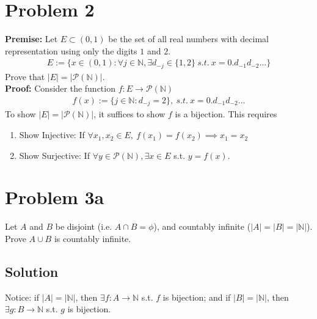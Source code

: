\documentclass[12pt,fleqn]{article}
\numberwithin{equation}{section} %
\begin{document}
\section*{Problem 2}
\textbf{Premise:} Let $E \subset (0,1)$ be the set of all real numbers with decimal representation using only the digits $1$ and $2$.
\begin{align}
	E:= \{x \in (0,1) : \forall j \in \mathbb N, \exists d_{-j} \in \{1,2\} ~ s.t. ~ x = 0.d_{-1}d_{-2}...\}
\end{align}
Prove that $|E| = |\mathcal P(\mathbb N)|$.\\
\textbf{Proof:} Consider the function $f: E \to \mathcal P(\mathbb N)$
\begin{align}
	f(x) := \{j \in \mathbb N : d_{-j} = 2\}, ~ s.t. ~ x=0.d_{-1}d_{-2}...
\end{align}
To show $|E| = |\mathcal P(\mathbb N)|$, it suffices to show $f$ is a bijection. This requires
\begin{enumerate}
	\item Show Injective: If $\forall x_1,x_2 \in E, ~ f(x_1) = f(x_2) \implies x_1 = x_2$
	\item Show Surjective: If $\forall y \in \mathcal P(\mathbb N), \exists x  \in E$ s.t. $y = f(x)$.
\end{enumerate}





\section*{Problem 3a}
Let $A$ and $B$ be disjoint (i.e. $A \cap B = \phi $), and countably infinite ($|A|=|B| = |\mathbb N|$). Prove $A\cup B$ is countably infinite.
\subsection*{Solution}

Notice: if $|A| = |\mathbb N|$, then $\exists f: A \to \mathbb N$ s.t. $f$ is bijection; and if $|B| = |\mathbb N|$, then $\exists g: B \to \mathbb N$ s.t. $g$ is bijection. 
\end{document}
